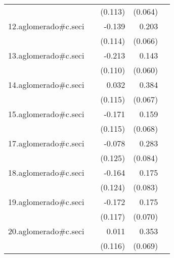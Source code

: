 {\begin{longtable}{l*{4}{D{.}{.}{-1}}}
            &                     &     (0.113)         &     (0.064)         &                     \\
\addlinespace
12.aglomerado#c.seci&                     &      -0.139         &       0.203\sym{**} &                     \\
            &                     &     (0.114)         &     (0.066)         &                     \\
\addlinespace
13.aglomerado#c.seci&                     &      -0.213         &       0.143\sym{*}  &                     \\
            &                     &     (0.110)         &     (0.060)         &                     \\
\addlinespace
14.aglomerado#c.seci&                     &       0.032         &       0.384\sym{***}&                     \\
            &                     &     (0.115)         &     (0.067)         &                     \\
\addlinespace
15.aglomerado#c.seci&                     &      -0.171         &       0.159\sym{*}  &                     \\
            &                     &     (0.115)         &     (0.068)         &                     \\
\addlinespace
17.aglomerado#c.seci&                     &      -0.078         &       0.283\sym{***}&                     \\
            &                     &     (0.125)         &     (0.084)         &                     \\
\addlinespace
18.aglomerado#c.seci&                     &      -0.164         &       0.175\sym{*}  &                     \\
            &                     &     (0.124)         &     (0.083)         &                     \\
\addlinespace
19.aglomerado#c.seci&                     &      -0.172         &       0.175\sym{*}  &                     \\
            &                     &     (0.117)         &     (0.070)         &                     \\
\addlinespace
20.aglomerado#c.seci&                     &       0.011         &       0.353\sym{***}&                     \\
            &                     &     (0.116)         &     (0.069)         &                     \\

\end{longtable}}
